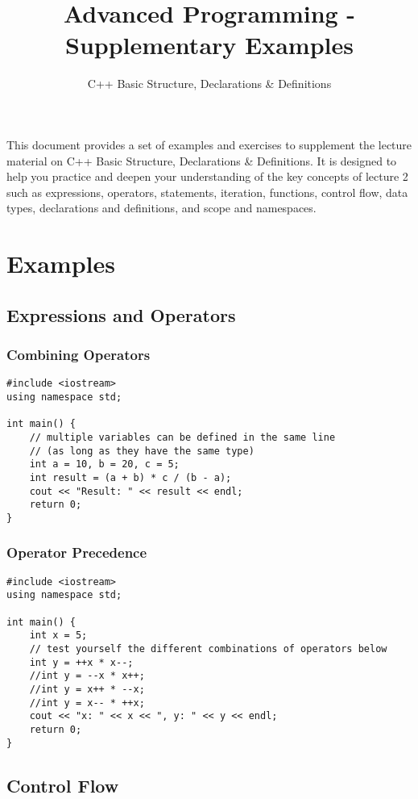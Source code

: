\documentclass{article}
\title{Advanced Programming - Supplementary Examples}
\author{C++ Basic Structure, Declarations \& Definitions}
\date{}
\begin{document}
\maketitle

This document provides a set of examples and exercises to supplement the lecture material on C++ Basic Structure, Declarations \& Definitions. It is designed to help you practice and deepen your understanding of the key concepts of lecture 2 such as expressions, operators, statements, iteration, functions, control flow, data types, declarations and definitions, and scope and namespaces.

\section*{Examples}

\subsection*{Expressions and Operators}
\subsubsection*{Combining Operators}

\begin{verbatim}
#include <iostream>
using namespace std;

int main() {
    // multiple variables can be defined in the same line
    // (as long as they have the same type)
    int a = 10, b = 20, c = 5;
    int result = (a + b) * c / (b - a);
    cout << "Result: " << result << endl;
    return 0;
}
\end{verbatim}

\subsubsection*{Operator Precedence}

\begin{verbatim}
#include <iostream>
using namespace std;

int main() {
    int x = 5;
    // test yourself the different combinations of operators below
    int y = ++x * x--;
    //int y = --x * x++;
    //int y = x++ * --x;
    //int y = x-- * ++x;
    cout << "x: " << x << ", y: " << y << endl;
    return 0;
}
\end{verbatim}

\subsection*{Control Flow}
\end{document}
